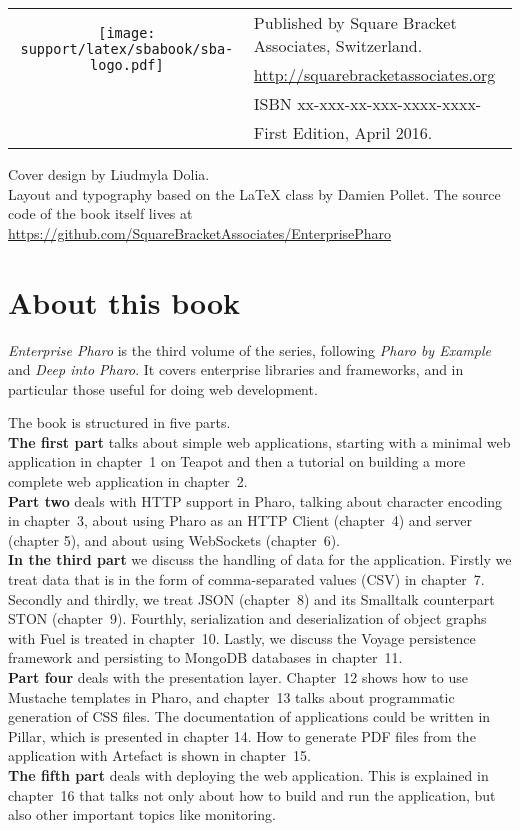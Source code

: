 \documentclass[10pt,twoside,english]{support/latex/sbabook/sbabook}
\begin{document}
{  \vfill

  \begin{tabular}{@{}c@{\quad}l}
    \multirow{2}{*}{\texttt{[image: support/latex/sbabook/sba-logo.pdf]}}
    & Published by Square Bracket Associates, Switzerland. \\
    & \url{http://squarebracketassociates.org} \\[\smallskipamount]
    & ISBN xx-xxx-xx-xxx-xxxx-xxxx- \\
    & First Edition, April 2016. \\
  \end{tabular}
  \medskip

  Cover design by Liudmyla Dolia. \\
  Layout and typography based on the  \LaTeX{} class by Damien Pollet.
  The source code of the book itself lives at
  \url{https://github.com/SquareBracketAssociates/EnterprisePharo}
}


\frontmatter
\pagestyle{plain}


\chapter*{About this book}

\emph{Enterprise Pharo} is the third volume of the series, following
\emph{Pharo by Example} and \emph{Deep into Pharo}. It covers
enterprise libraries and frameworks, and in particular those useful for
doing web development.

The book is structured in five parts.\\
\textbf{The first part} talks about simple web applications, starting
with a minimal web application in chapter~1 on Teapot and then a
tutorial on building a more complete web application in chapter~2.\\
\textbf{Part two} deals with HTTP support in Pharo,
talking about character encoding in chapter~3, about using Pharo as an
HTTP Client (chapter~4) and server (chapter 5), and about using
WebSockets (chapter~6).\\
\textbf{In the third part} we discuss the handling of data for the application.
Firstly we treat data that is in the form of comma-separated values (CSV) in
chapter~7. Secondly and thirdly, we treat JSON (chapter~8) and its Smalltalk
counterpart STON (chapter~9). Fourthly, serialization and deserialization of
object graphs with Fuel is treated in chapter~10. Lastly, we discuss the Voyage
persistence framework and persisting to MongoDB databases in chapter~11.\\
\textbf{Part four} deals with the presentation layer. Chapter~12 shows how to
use Mustache templates in Pharo, and chapter~13 talks about programmatic
generation of CSS files. The documentation of applications could be written in
Pillar, which is presented in chapter 14. How to generate PDF files from the
application with Artefact is shown in chapter~15.\\
\textbf{The fifth part} deals with deploying the web application. This is
explained in chapter~16 that talks not only about how to build and run the
application, but also other important topics like monitoring.
\end{document}
